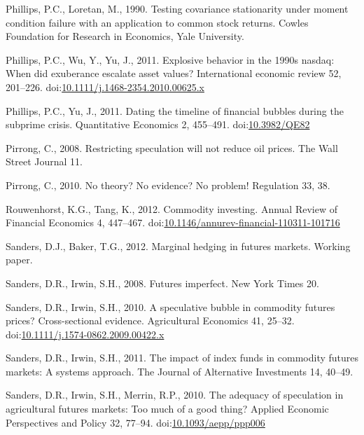\documentclass[]{elsarticle} %
\begin{document}
\leavevmode\hypertarget{ref-phillips_testing_1990}{}%
Phillips, P.C., Loretan, M., 1990. Testing covariance stationarity under
moment condition failure with an application to common stock returns.
Cowles Foundation for Research in Economics, Yale University.

\leavevmode\hypertarget{ref-phillips_explosive_2011}{}%
Phillips, P.C., Wu, Y., Yu, J., 2011. Explosive behavior in the 1990s
nasdaq: When did exuberance escalate asset values? International
economic review 52, 201--226.
doi:\href{https://doi.org/10.1111/j.1468-2354.2010.00625.x}{10.1111/j.1468-2354.2010.00625.x}

\leavevmode\hypertarget{ref-phillips_dating_2011}{}%
Phillips, P.C., Yu, J., 2011. Dating the timeline of financial bubbles
during the subprime crisis. Quantitative Economics 2, 455--491.
doi:\href{https://doi.org/10.3982/QE82}{10.3982/QE82}

\leavevmode\hypertarget{ref-pirrong_restricting_2008}{}%
Pirrong, C., 2008. Restricting speculation will not reduce oil prices.
The Wall Street Journal 11.

\leavevmode\hypertarget{ref-pirrong_no_2010}{}%
Pirrong, C., 2010. No theory? No evidence? No problem! Regulation 33,
38.

\leavevmode\hypertarget{ref-rouwenhorst_commodity_2012}{}%
Rouwenhorst, K.G., Tang, K., 2012. Commodity investing. Annual Review of
Financial Economics 4, 447--467.
doi:\href{https://doi.org/10.1146/annurev-financial-110311-101716}{10.1146/annurev-financial-110311-101716}

\leavevmode\hypertarget{ref-sanders_marginal_2012}{}%
Sanders, D.J., Baker, T.G., 2012. Marginal hedging in futures markets.
Working paper.

\leavevmode\hypertarget{ref-sanders_futures_2008}{}%
Sanders, D.R., Irwin, S.H., 2008. Futures imperfect. New York Times 20.

\leavevmode\hypertarget{ref-sanders_speculative_2010}{}%
Sanders, D.R., Irwin, S.H., 2010. A speculative bubble in commodity
futures prices? Cross-sectional evidence. Agricultural Economics 41,
25--32.
doi:\href{https://doi.org/10.1111/j.1574-0862.2009.00422.x}{10.1111/j.1574-0862.2009.00422.x}

\leavevmode\hypertarget{ref-sanders_impact_2011}{}%
Sanders, D.R., Irwin, S.H., 2011. The impact of index funds in commodity
futures markets: A systems approach. The Journal of Alternative
Investments 14, 40--49.

\leavevmode\hypertarget{ref-sanders_adequacy_2010}{}%
Sanders, D.R., Irwin, S.H., Merrin, R.P., 2010. The adequacy of
speculation in agricultural futures markets: Too much of a good thing?
Applied Economic Perspectives and Policy 32, 77--94.
doi:\href{https://doi.org/10.1093/aepp/ppp006}{10.1093/aepp/ppp006}
\end{document}
